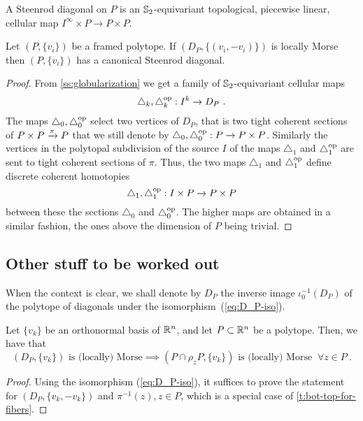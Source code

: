 \begin{definition}
	A Steenrod diagonal on $P$ is an $\mathbb{S}_2$-equivariant topological, piecewise linear, cellular map $I^\infty \times P \to P \times P$.
\end{definition}

\begin{theorem}
	Let $(P,\{v_i\})$ be a framed polytope.
	If $(D_P, \{(v_i,-v_i)\})$ is locally Morse then
	$(P,\{v_i\})$ has a canonical Steenrod diagonal.
\end{theorem}

\begin{proof}
	From \cref{ss:globularization} we get a family of $\mathbb{S}_2$-equivariant cellular maps
	\[
	\triangle_k, \triangle_k^{\mathrm{op}} : I^k \to D_P \ .
	\]
	The maps $\triangle_0, \triangle_0^{\mathrm{op}}$ select two vertices of $D_P$, that is two tight coherent sections of $P\times P \xrightarrow{\pi} P$ that we still denote by $\triangle_0, \triangle_0^{\mathrm{op}} : P \to P\times P$.
	Similarly the vertices in the polytopal subdivision of the source $I$ of the maps $\triangle_1$ and $\triangle_1^{\mathrm{op}}$ are sent to tight coherent sections of $\pi$.
	Thus, the two maps $\triangle_1$ and $\triangle_1^{\mathrm{op}}$ define discrete coherent homotopies
	\[
	\triangle_1, \triangle_1^{\mathrm{op}} : I\times P \to P \times P
	\]
	between these the sections $\triangle_0$ and $\triangle_0^{\mathrm{op}}$.
	The higher maps are obtained in a similar fashion, the ones above the dimension of $P$ being trivial.
\end{proof}



\subsection{Other stuff to be worked out}

When the context is clear, we shall denote by $D_P$ the inverse image $\iota_0^{-1}(D_P)$ of the polytope of diagonals under the isomorphism~(\ref{eq:D_P-iso}).

\begin{lemma} \label{l:bot-top-for-DP}
	Let $\{v_k\}$ be an orthonormal basis of $\mathbb{R}^n$, and let $P\subset \mathbb{R}^n$ be a polytope.
	Then, we have that
	\[
	(D_P,\{v_k\}) \text{ is (locally) Morse} 
	\implies (P\cap \rho_z P,\{v_k\}) \text{ is (locally) Morse }  \ \forall z \in P \ .
	\]
\end{lemma}

\begin{proof}
	Using the isomorphism (\ref{eq:D_P-iso}), it suffices to prove the statement for $(D_P,\{v_k,-v_k\})$ and $\pi^{-1}(z), z \in P$, which is a special case of \cref{t:bot-top-for-fibers}.
\end{proof}

